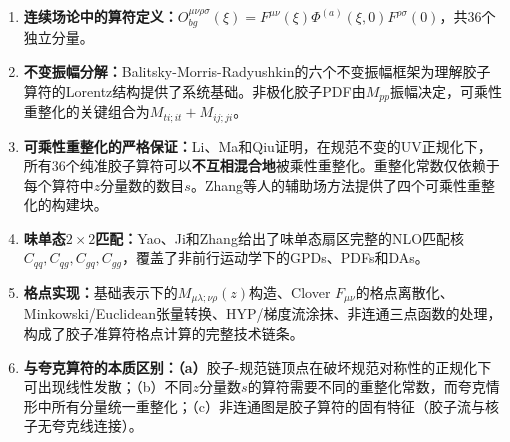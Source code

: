 \documentclass[12pt,a4paper]{ctexart}
\theoremstyle{definition}
\begin{document}
\begin{enumerate}
    \item \textbf{连续场论中的算符定义：}$O^{\mu\nu\rho\sigma}_{bg}(\xi) = F^{\mu\nu}(\xi) \Phi^{(a)}(\xi, 0) F^{\rho\sigma}(0)$，共36个独立分量。

    \item \textbf{不变振幅分解：}Balitsky-Morris-Radyushkin的六个不变振幅框架\cite{Balitsky2020}为理解胶子算符的Lorentz结构提供了系统基础。非极化胶子PDF由$M_{pp}$振幅决定，可乘性重整化的关键组合为$M_{ti;it}+M_{ij;ji}$。

    \item \textbf{可乘性重整化的严格保证：}Li、Ma和Qiu证明\cite{Li2018multiplicative}，在规范不变的UV正规化下，所有36个纯准胶子算符可以\textbf{不互相混合地}被乘性重整化。重整化常数仅依赖于每个算符中$z$分量数的数目$s$。Zhang等人的辅助场方法\cite{Zhang2019}提供了四个可乘性重整化的构建块。

    \item \textbf{味单态$2\times2$匹配：}Yao、Ji和Zhang\cite{Yao2023}给出了味单态扇区完整的NLO匹配核$C_{qq}, C_{qg}, C_{gq}, C_{gg}$，覆盖了非前行运动学下的GPDs、PDFs和DAs。

    \item \textbf{格点实现：}基础表示下的$M_{\mu\lambda;\nu\rho}(z)$构造、Clover $F_{\mu\nu}$的格点离散化、Minkowski/Euclidean张量转换、HYP/梯度流涂抹、非连通三点函数的处理，构成了胶子准算符格点计算的完整技术链条。

    \item \textbf{与夸克算符的本质区别：（a）}胶子-规范链顶点在破坏规范对称性的正规化下可出现线性发散；（b）不同$z$分量数$s$的算符需要不同的重整化常数，而夸克情形中所有分量统一重整化；（c）非连通图是胶子算符的固有特征（胶子流与核子无夸克线连接）。
\end{enumerate}
\end{document}
